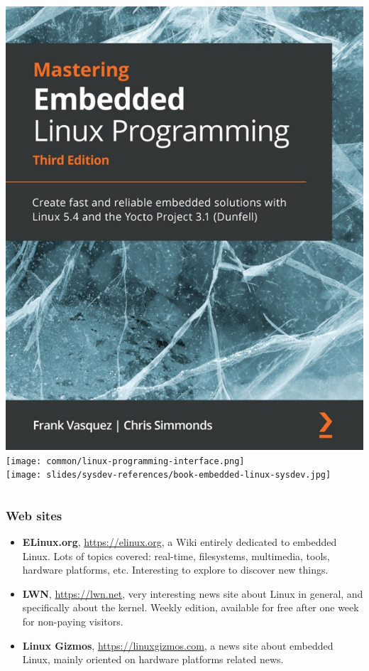 \begin{frame}
\begin{columns}
    \includegraphics[height=0.25\textheight]{slides/sysdev-references/book-mastering-embedded-linux3.jpg}\\
    \vspace{0.5cm}
    \texttt{[image: common/linux-programming-interface.png]}\\
    \vspace{0.5cm}
    \texttt{[image: slides/sysdev-references/book-embedded-linux-sysdev.jpg]}\\
  \end{columns}
\end{frame}

\begin{frame}
  \frametitle{Web sites}
  \begin{itemize}
  \item {\bf ELinux.org}, \url{https://elinux.org}, a Wiki entirely
    dedicated to embedded Linux. Lots of topics covered: real-time,
    filesystems, multimedia, tools, hardware platforms,
    etc. Interesting to explore to discover new things.
  \item {\bf LWN}, \url{https://lwn.net}, very interesting news site
    about Linux in general, and specifically about the kernel. Weekly
    edition, available for free after one week for non-paying
    visitors.
  \item {\bf Linux Gizmos}, \url{https://linuxgizmos.com}, a news site
    about embedded Linux, mainly oriented on hardware platforms
    related news.
  \end{itemize}
\end{frame}

